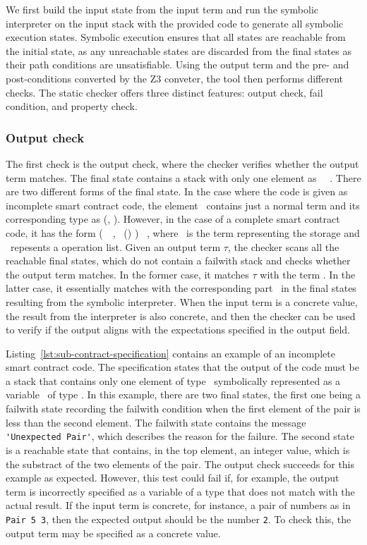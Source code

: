 \documentclass[a4paper,USenglish,cleveref, autoref, thm-restate]{lipics-v2021}
\begin{document}
We first build the input state from the input term and run the
symbolic interpreter on the input stack with the provided code to
generate all symbolic execution states. Symbolic execution ensures
that all states are reachable from the initial state, as any
unreachable states are discarded from the final states as their path
conditions are unsatisfiable. Using the output term and the pre-
and post-conditions converted by the Z3 conveter, the tool then
performs different checks. The static checker offers three distinct
features: output check, fail condition, and property check. 

\subsubsection{Output check}
\label{sec:output-check}
The first check is the output check, where the checker verifies
whether the output term matches. The final state contains a stack
with only one element as \Stack\ \STACKCONCAT\ \EMPTYSTACK. There are
two different forms of the final state. In the case where the code is
given as incomplete smart contract code, the element \Stack\ contains
just a normal term and its corresponding type as (\Term,
\TY). However, in the case of a complete smart contract code, it has
the form (\PAIR\ \VOPERATIONLIST\ \VSTORAGE, \TPAIR\ (\TOPERATIONLIST)
\TYS) \STACKCONCAT\ \EMPTYSTACK, where \VSTORAGE\ is the term
representing the storage and \VOPERATIONLIST\ repesents a operation
list. Given an output term $ \tau$, the checker scans all the reachable final
states, which do not contain a failwith stack and checks whether the
output term matches. In the former case, it matches $ \tau$  with
the term \Term. In the latter case, it essentially matches with the
corresponding part \VSTORAGE\ in the final states resulting from the
symbolic interpreter. When the input term is a concrete value, the
result from the interpreter is also concrete, and then the checker can
be used to verify if the output aligns with the expectations
specified in the output field. 

Listing~\ref{lst:sub-contract-specification} contains an example of an
incomplete smart contract code. The specification states that the
output of the code must be a stack that contains only one element of
type \TINT\, symbolically represented as a variable \VZ\ of type
\TINT.  In this example, there are two final states, the first one
being a failwith state recording the failwith condition when the first
element of the pair is less than the second element. The failwith
state contains the message \lstinline|'Unexpected Pair'|, which
describes the reason for the failure. The second state is a reachable
state that contains, in the top element, an integer value, which is
the substract of the two elements of the pair. The output check succeeds for
this example as expected. However, this test could fail if, for
example, the output term is incorrectly specified as a variable of
a type that does not match with the actual result. If the input
term is concrete, for instance, a pair of numbers as in
\lstinline|Pair 5 3|, then the expected output should be the number
\lstinline|2|. To check this,  the output term may be specified as
a concrete value.
\end{document}
